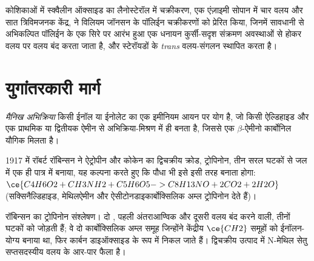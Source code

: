 कोशिकाओं में स्क्वैलीन ऑक्साइड का लैनोस्टेरॉल में चक्रीकरण, एक एंज़ाइमी सोपान में चार वलय और सात
त्रिविमजनक केंद्र, ने विलियम जॉनसन के पॉलिईन चक्रीकरणों को प्रेरित किया, जिनमें
सावधानी से अभिकल्पित पॉलिईन के एक सिरे पर आरंभ हुआ एक धनायन कुर्सी-सदृश संक्रमण
अवस्थाओं से होकर वलय पर वलय बंद करता जाता है, और स्टेरॉयडों के
\textit{trans} वलय-संगलन स्थापित करता है।

\section{युगांतरकारी मार्ग}

\begin{definition}[मैनिख अभिक्रिया]\label{def:b3:total-synthesis:mannich}
\emph{मैनिख अभिक्रिया} किसी ईनॉल या ईनोलेट का एक
इमीनियम आयन पर योग है, जो किसी ऐल्डिहाइड और एक प्राथमिक या द्वितीयक
ऐमीन से अभिक्रिया-मिश्रण में ही बनता है, जिससे एक $\beta$-ऐमीनो कार्बोनिल यौगिक मिलता है।
\end{definition}

1917 में रॉबर्ट रॉबिन्सन ने ऐट्रोपीन और कोकेन का द्विचक्रीय क्रोड, ट्रोपिनोन,
तीन सरल घटकों से जल में एक ही पात्र में बनाया, यह कल्पना करते हुए कि
पौधा भी इसे इसी तरह बनाता होगा:
$\ce{C4H6O2 + CH3NH2 + C5H6O5 -> C8H13NO + 2CO2 + 2H2O}$ (सक्सिनैल्डिहाइड, मेथिलऐमीन और
ऐसीटोनडाइकार्बोक्सिलिक अम्ल ट्रोपिनोन देते हैं)।

\begin{omfigure}

{\small रॉबिन्सन का ट्रोपिनोन संश्लेषण। दो , पहली
अंतराआण्विक और दूसरी वलय बंद करने वाली, तीनों घटकों को जोड़ती हैं;
वे दो कार्बोक्सिलिक अम्ल समूह जिन्होंने केंद्रीय $\ce{CH2}$ समूहों को ईनॉलन-योग्य बनाया था, फिर
कार्बन डाइऑक्साइड के रूप में निकल जाते हैं। द्विचक्रीय उत्पाद में N-मेथिल सेतु
सप्तसदस्यीय वलय के आर-पार फैला है।}
\end{omfigure}

